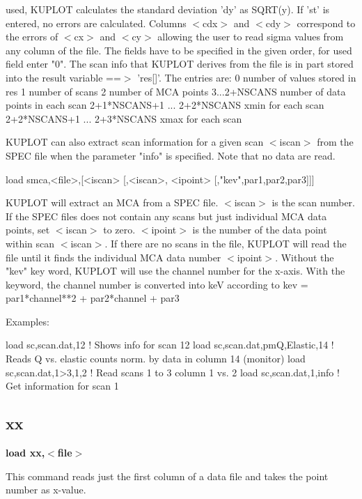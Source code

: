 used, KUPLOT calculates the standard deviation 'dy' as SQRT(y). If 
'st' is entered, no errors are calculated.  Columns $ <$cdx$> $ and $ <$cdy$> $ 
correspond to the errors of $ <$cx$> $ and $ <$cy$> $ allowing the user to read 
sigma values from any column of the file. The fields have to be 
specified in the given order, for used field enter "0". 
The scan info that KUPLOT derives from the file is in part stored 
into the result variable ==$> $ 'res[]'. The entries are: 
0  number of values stored in res 
1  number of scans 
2  number of MCA points 
3...2+NSCANS number of data points in each scan 
2+1*NSCANS+1 ... 2+2*NSCANS  xmin for each scan 
2+2*NSCANS+1 ... 2+3*NSCANS  xmax for each scan 
\par
KUPLOT can also extract scan information for a given scan $ <$iscan$> $ 
from the SPEC file when the parameter "info" is specified. Note that 
no data are read. 
\par
\begin{MacVerbatim}
load smca,<file>,[<iscan> [,<iscan>, <ipoint> [,"kev",par1,par2,par3]]]
\end{MacVerbatim}
KUPLOT will extract an MCA from a SPEC file. 
$ <$iscan$> $ is the scan number. If the SPEC files does not contain any 
        scans but just individual MCA data points, set $ <$iscan$> $ to zero. 
$ <$ipoint$> $ is the number of the data point within scan $ <$iscan$> $. If there 
        are no scans in the file, KUPLOT will read the file until it 
        finds the individual MCA data number $ <$ipoint$> $. 
Without the "kev" key word, KUPLOT will use the channel number for the 
x-axis. With the keyword, the channel number is converted into keV 
according to kev = par1*channel**2 + par2*channel + par3 
\par
Examples: 
\par
\begin{MacVerbatim}
load sc,scan.dat,12              ! Shows info for scan 12
load sc,scan.dat,pmQ,Elastic,14  ! Reads Q vs. elastic counts norm.
                                   by data in column 14 (monitor)
load sc,scan.dat,1>3,1,2         ! Read scans 1 to 3 column 1 vs. 2
load sc,scan.dat,1,info          ! Get information for scan 1
\end{MacVerbatim}
\subsection*{xx}
{\bf load xx,$ <$file$> $ \par }
\par
\vspace{3pt}
This command reads just the first column of a data file and takes 
the point number as x-value. 
